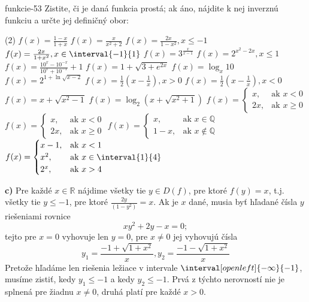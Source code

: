 \begin{defproblem}{funkcie-53}
Zistite, či je daná funkcia prostá; ak áno, nájdite k nej inverznú funkciu a
určte jej definičný obor:
\begin{tasks}(2)
  \task $f(x)=\frac{1-x}{1+x}$
  \task $f(x)=\frac{x}{x^2+2}$
  \task $f(x)=\frac{2x}{1-x^2},x \leq -1$
  \task $f(x)=\frac{2x}{1+x^2},x \in \interval{-1}{1}$
  \task $f(x)=3^{\frac{x}{x-1}}$
  \task $f(x)=2^{x^2-2x},x\leq 1$
  \task $f(x)=\frac{10^x-10^{-x}}{10^x+10^{-x}}+1$
  \task $f(x)=1+\sqrt{3+e^{2x}}$
  \task $f(x)=\log_x 10$
  \task $f(x)=2^{1+\ln\sqrt{x-2}}$
  \task $f(x)=\frac{1}{2}(x-\frac{1}{x}),x>0$
  \task $f(x)=\frac{1}{2}(x-\frac{1}{x}),x<0$
  \task $f(x)=x+\sqrt{x^2-1}$
  \task $f(x)=\log_2 (x+\sqrt{x^2+1})$
  \task
    $f(x)=
      \begin{cases}
        x,  & \text{ak } x < 0 \\
        2x, & \text{ak } x \geq 0
      \end{cases}
    $
  \task
    $f(x)=
      \begin{cases}
        x,  & \text{ak } x < 0 \\
        2x, & \text{ak } x \geq 0
      \end{cases}
    $
  \task
    $f(x)=
      \begin{cases}
        x,   & \text{ak } x \in \mathbb{Q} \\
        1-x, & \text{ak } x \notin \mathbb{Q}
      \end{cases}
    $
  \task
    $f(x)=
      \begin{cases}
        x-1, & \text{ak } x < 1 \\
        x^2, & \text{ak } x \in \interval{1}{4} \\
        2^x, & \text{ak } x > 4
      \end{cases}
    $
\end{tasks}

\begin{solution}
  \textbf{c)}
  Pre každé $x \in \mathbb{R}$ nájdime všetky tie $y \in D(f)$, pre ktoré $f(y)
  = x$, t.j. všetky tie $y \leq -1$, pre ktoré $\frac{2y}{(1-y^2)} = x$. Ak je
  $x$ dané, musia byť hľadané čísla $y$ riešeniami rovnice $$xy^2+2y-x=0;$$
  tejto pre $x=0$ vyhovuje len $y=0$, pre $x\neq 0$ jej vyhovujú čísla
  \[
    y_1=\frac{-1+\sqrt{1+x^2}}{x}, y_2=\frac{-1-\sqrt{1+x^2}}{x}
  \]
  Pretože hľadáme len riešenia ležiace v intervale $\interval[open
  left]{-\infty}{-1}$, musíme zistiť, kedy $y_1\leq -1$ a kedy $y_2\leq -1$.
  Prvá z týchto nerovností nie je splnená pre žiadnu $x\neq 0$, druhá platí pre
  každé $x>0$.


\end{solution}
\end{defproblem}
